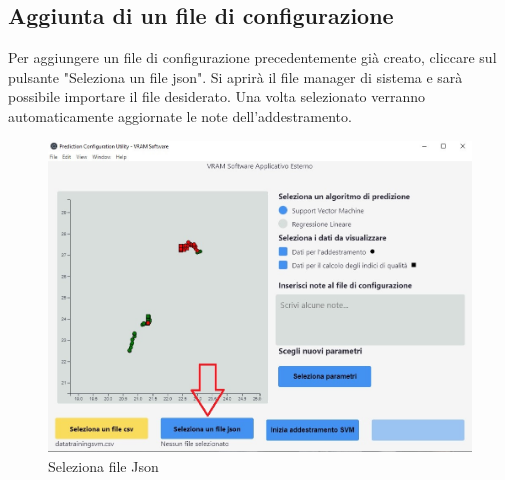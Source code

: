 	\subsection{Aggiunta di un file di configurazione}
	Per aggiungere un file di configurazione precedentemente già creato, cliccare sul pulsante "Seleziona un file json".
	Si aprirà il file manager di sistema e sarà possibile importare il file desiderato. Una volta selezionato verranno automaticamente aggiornate le note dell'addestramento.
	\begin{figure}[H] 	
		\begin{center}
			\includegraphics[width=\linewidth]{img/3.jpg}
		\end{center}
		\caption{Seleziona file Json}	
	\end{figure}
